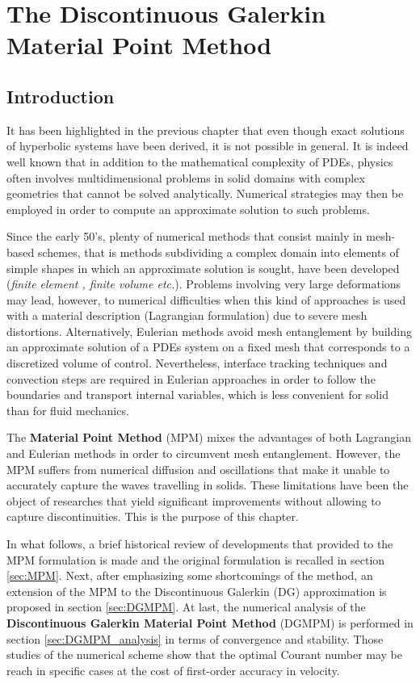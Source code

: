 \chapter{The Discontinuous Galerkin Material Point Method}

\section*{Introduction}
It has been highlighted in the previous chapter that even though exact solutions of hyperbolic systems have been derived, it is not possible in general. It is indeed well known that in addition to the mathematical complexity of PDEs, physics often involves multidimensional problems in solid domains with complex geometries that cannot be solved analytically. Numerical strategies may then be employed in order to compute an approximate solution to such problems.

Since the early 50's, plenty of numerical methods that consist mainly in mesh-based schemes, that is methods subdividing a complex domain into elements of simple shapes in which an approximate solution is sought, have been developed (\textit{finite element \cite{Belytschko}, finite volume \cite{Leveque} etc.}). Problems involving very large deformations may lead, however, to numerical difficulties when this kind of approaches is used with a material description (Lagrangian formulation) due to severe mesh distortions. Alternatively, Eulerian methods avoid mesh entanglement by building an approximate solution of a PDEs system on a fixed mesh that corresponds to a discretized volume of control. Nevertheless, interface tracking techniques and convection steps are required in Eulerian approaches in order to follow the boundaries and transport internal variables, which is less convenient for solid than for fluid mechanics.

The \textbf{Material Point Method} (MPM) \cite{Sulsky94} mixes the advantages of both Lagrangian and Eulerian methods in order to circumvent mesh entanglement. However, the MPM suffers from numerical diffusion and oscillations that make it unable to accurately capture the waves travelling in solids. These limitations have been the object of researches that yield significant improvements without allowing to capture discontinuities. This is the purpose of this chapter.

In what follows, a brief historical review of developments that provided to the MPM formulation is made and the original formulation is recalled in section \ref{sec:MPM}. Next, after emphasizing some shortcomings of the method, an extension of the MPM to the Discontinuous Galerkin (DG) approximation is proposed in section \ref{sec:DGMPM}. At last, the numerical analysis of the \textbf{Discontinuous Galerkin Material Point Method} (DGMPM) is performed in section \ref{sec:DGMPM_analysis} in terms of convergence and stability. Those studies of the numerical scheme show that the optimal Courant number may be reach in specific cases at the cost of first-order accuracy in velocity.



